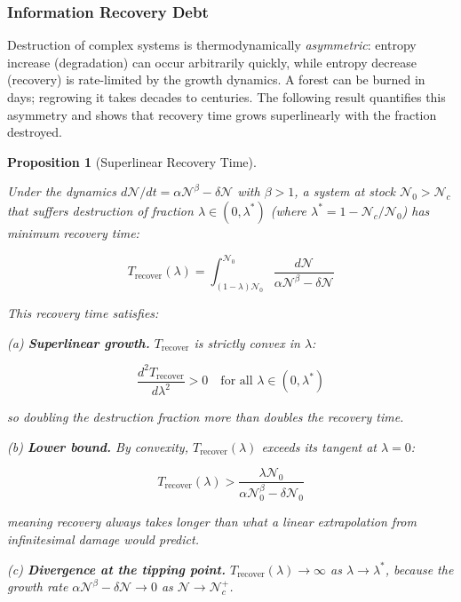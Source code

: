 \documentclass[11pt]{article}
\theoremstyle{plain}
\newtheorem{proposition}[theorem]{Proposition}
\theoremstyle{definition}
\theoremstyle{remark}
\let\origsubsubsection\subsubsection
\renewcommand{\subsubsection}{\needspace{4\baselineskip}\origsubsubsection}
\begin{document}
\subsubsection{Information Recovery
Debt}\label{information-recovery-debt}

Destruction of complex systems is thermodynamically \emph{asymmetric}:
entropy increase (degradation) can occur arbitrarily quickly, while
entropy decrease (recovery) is rate-limited by the growth dynamics. A
forest can be burned in days; regrowing it takes decades to centuries.
The following result quantifies this asymmetry and shows that recovery
time grows superlinearly with the fraction destroyed.

\begin{proposition}[Superlinear Recovery Time]
\label{prop-superlinear-recovery-time}

Under the dynamics $d\mathcal{N}/dt = \alpha\mathcal{N}^\beta - \delta\mathcal{N}$ with $\beta > 1$, a system at stock $\mathcal{N}_0 > \mathcal{N}_c$ that suffers destruction of fraction $\lambda \in (0, \lambda^*)$ (where $\lambda^* = 1 - \mathcal{N}_c/\mathcal{N}_0$) has minimum recovery time:

$$T_{\text{recover}}(\lambda) = \int_{(1-\lambda)\mathcal{N}_0}^{\mathcal{N}_0} \frac{d\mathcal{N}}{\alpha\mathcal{N}^\beta - \delta\mathcal{N}}$$

This recovery time satisfies:

(a) \textbf{Superlinear growth.} $T_{\text{recover}}$ is strictly convex in $\lambda$:

$$\frac{d^2 T_{\text{recover}}}{d\lambda^2} > 0 \quad \text{for all } \lambda \in (0, \lambda^*)$$

so doubling the destruction fraction more than doubles the recovery time.

(b) \textbf{Lower bound.} By convexity, $T_{\text{recover}}(\lambda)$ exceeds its tangent at $\lambda = 0$:

$$T_{\text{recover}}(\lambda) > \frac{\lambda \mathcal{N}_0}{\alpha\mathcal{N}_0^\beta - \delta\mathcal{N}_0}$$

meaning recovery always takes longer than what a linear extrapolation from infinitesimal damage would predict.

(c) \textbf{Divergence at the tipping point.} $T_{\text{recover}}(\lambda) \to \infty$ as $\lambda \to \lambda^*$, because the growth rate $\alpha\mathcal{N}^\beta - \delta\mathcal{N} \to 0$ as $\mathcal{N} \to \mathcal{N}_c^+$.
\end{proposition}
\end{document}
